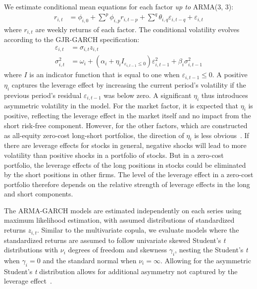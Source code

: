 We estimate conditional mean equations for each factor \emph{up to} ARMA(3, 3):
\begin{align}
  r_{i,t} &=
    \phi_{i,0} +
    \sum^p \phi_{i,p} r_{i,t - p} +
    \sum^q \theta_{i,q} \varepsilon_{i,t - q} + 
    \varepsilon_{i,t}
    \label{eq:garch_mean}
\end{align}
where $r_{i,t}$ are weekly returns of each factor. The conditional volatility evolves according to the GJR-GARCH specification:
\begin{align}
  \varepsilon_{i,t} &= \sigma_{i,t} z_{i,t} \\
  \sigma_{i,t}^2 &=
    \omega_i +
    (\alpha_i + \eta_i I_{\varepsilon_{i,t-1} \leq 0}) \varepsilon_{i,t - 1}^2 +
    \beta_{i} \sigma^2_{i,t - 1}
    \label{eq:garch_garch}
\end{align}
where $I$ is an indicator function that is equal to one when $\varepsilon_{i,t-1} \leq 0$. A positive $\eta_i$ captures the leverage effect by increasing the current period's volatility if the previous period's residual $\varepsilon_{i,t-1}$ was below zero. A significant $\eta_i$ thus introduces asymmetric volatility in the model. For the market factor, it is expected that $\eta_i$ is positive, reflecting the leverage effect in the market itself and no impact from the short risk-free component. However, for the other factors, which are constructed as all-equity zero-cost long-short portfolios, the direction of $\eta_i$ is less obvious~\autocite{ChristoffersenLanglois2013}. If there are leverage effects for stocks in general, negative shocks will lead to more volatility than positive shocks in a portfolio of stocks. But in a zero-cost portfolio, the leverage effects of the long positions in stocks could be eliminated by the short positions in other firms. The level of the leverage effect in a zero-cost portfolio therefore depends on the relative strength of leverage effects in the long and short components.

The ARMA-GARCH models are estimated independently on each series using maximum likelihood estimation, with assumed distributions of standardized returns $z_{i,t}$. Similar to the multivariate copula, we evaluate models where the standardized returns are assumed to follow univariate skewed Student's \emph{t} distributions with $\nu_i$ degrees of freedom and skewness $\gamma_i$, nesting the Student's \emph{t} when $\gamma_i = 0$ and the standard normal when $\nu_i = \infty$. Allowing for the asymmetric Student's \emph{t} distribution allows for additional asymmetry not captured by the leverage effect~\autocite{ChristoffersenErrunzaJacobLanglois2012}.

